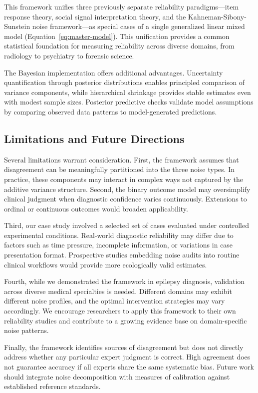 This framework unifies three previously separate reliability paradigms---item response theory, social signal interpretation theory, and the Kahneman-Sibony-Sunstein noise framework---as special cases of a single generalized linear mixed model (Equation~\ref{eq:master-model}). This unification provides a common statistical foundation for measuring reliability across diverse domains, from radiology to psychiatry to forensic science.

The Bayesian implementation offers additional advantages. Uncertainty quantification through posterior distributions enables principled comparison of variance components, while hierarchical shrinkage provides stable estimates even with modest sample sizes. Posterior predictive checks validate model assumptions by comparing observed data patterns to model-generated predictions.

\subsection*{Limitations and Future Directions}

Several limitations warrant consideration. First, the framework assumes that disagreement can be meaningfully partitioned into the three noise types. In practice, these components may interact in complex ways not captured by the additive variance structure. Second, the binary outcome model may oversimplify clinical judgment when diagnostic confidence varies continuously. Extensions to ordinal or continuous outcomes would broaden applicability.

Third, our case study involved a selected set of cases evaluated under controlled experimental conditions. Real-world diagnostic reliability may differ due to factors such as time pressure, incomplete information, or variations in case presentation format. Prospective studies embedding noise audits into routine clinical workflows would provide more ecologically valid estimates.

Fourth, while we demonstrated the framework in epilepsy diagnosis, validation across diverse medical specialties is needed. Different domains may exhibit different noise profiles, and the optimal intervention strategies may vary accordingly. We encourage researchers to apply this framework to their own reliability studies and contribute to a growing evidence base on domain-specific noise patterns.

Finally, the framework identifies sources of disagreement but does not directly address whether any particular expert judgment is correct. High agreement does not guarantee accuracy if all experts share the same systematic bias. Future work should integrate noise decomposition with measures of calibration against established reference standards.

